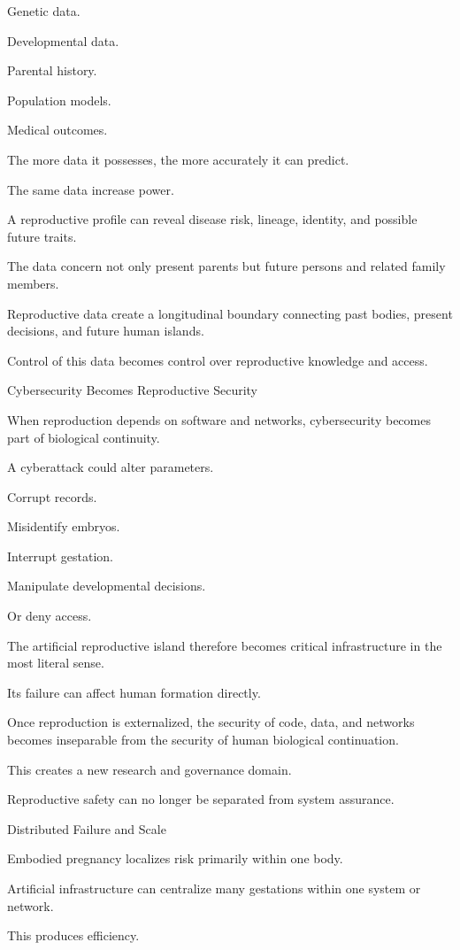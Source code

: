 Genetic data.

Developmental data.

Parental history.

Population models.

Medical outcomes.

The more data it possesses, the more accurately it can predict.

The same data increase power.

A reproductive profile can reveal disease risk, lineage, identity, and possible future traits.

The data concern not only present parents but future persons and related family members.

Reproductive data create a longitudinal boundary connecting past bodies, present decisions, and future human islands.

Control of this data becomes control over reproductive knowledge and access.

Cybersecurity Becomes Reproductive Security

When reproduction depends on software and networks, cybersecurity becomes part of biological continuity.

A cyberattack could alter parameters.

Corrupt records.

Misidentify embryos.

Interrupt gestation.

Manipulate developmental decisions.

Or deny access.

The artificial reproductive island therefore becomes critical infrastructure in the most literal sense.

Its failure can affect human formation directly.

Once reproduction is externalized, the security of code, data, and networks becomes inseparable from the security of human biological continuation.

This creates a new research and governance domain.

Reproductive safety can no longer be separated from system assurance.

Distributed Failure and Scale

Embodied pregnancy localizes risk primarily within one body.

Artificial infrastructure can centralize many gestations within one system or network.

This produces efficiency.

